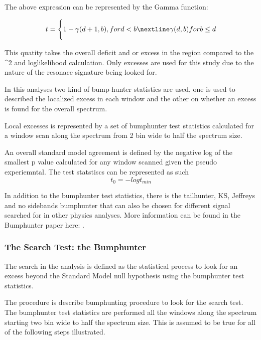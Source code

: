     The above expression can be represented by the Gamma function: 

    \begin{equation}
    t = \Bigg\{  1-\gamma(d+1, b), for d < b \nextline
                 \gamma(d,b)       for b \leq d

    \label{test statistics}
    \end{equation}


    This quatity takes the overall deficit and or excess in the region compared to the \chi^{2} and loglikelihood calculation. Only excesses are used for this study due to the nature of the resonace signature being looked for. 

    In this analyses two kind of bump-hunter statistics are used, one is used to described the localized excess in each window and the other on whether an excess is found for the overall spectrum.

    Local excesses is represented by a set of bumphunter test statistics calculated for a window scan along the spectrum from 2 bin wide to half the spectrum size.

    An overall standard model agreement is defined by the negative log of the smallest p value calculated for any window scanned given the pseudo experiemntal. The test statstiscs can be represented as such 
    \[ t_{0} = - log t_{min} \]

    
    In addition to the bumphunter test statistics, there is the tailhunter, KS, Jeffreys and no sidebands bumphunter that can also be chosen for different signal searched for in other physics analyses. More information can be found in the Bumphunter paper here: . 


    \subsubsection{The Search Test: the Bumphunter}
    The search in the analysis is defined as the statistical process to look for an excess beyond the Standard Model null hypothesis using the bumphunter test statistics. 

    The procedure is describe bumphunting procedure to look for the search test.
    The bumphunter test statistics are performed all the windows along the spectrum starting two bin wide to half the spectrum size. This is assumed to be true for all of the following steps illustrated. 


